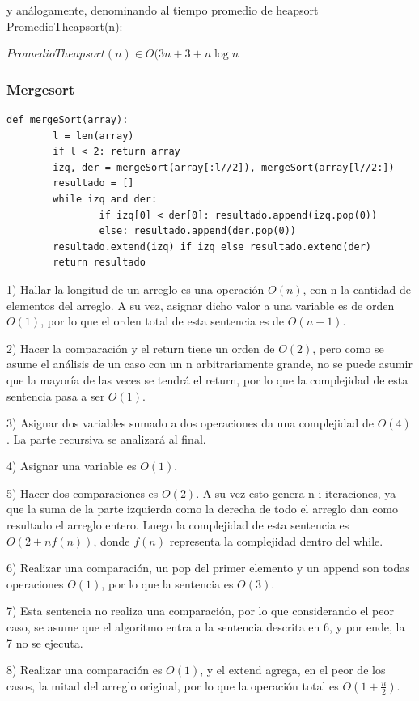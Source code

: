 \documentclass[article,a4paper]{article}
\begin{document}
y análogamente, denominando al tiempo promedio de heapsort PromedioTheapsort(n):

$PromedioTheapsort(n) \in O(3n + 3 +n \log n$ 

\subsubsection{Mergesort}
\begin{verbatim}
def mergeSort(array):
        l = len(array)
        if l < 2: return array
        izq, der = mergeSort(array[:l//2]), mergeSort(array[l//2:])
        resultado = []
        while izq and der:
                if izq[0] < der[0]: resultado.append(izq.pop(0))
                else: resultado.append(der.pop(0))
        resultado.extend(izq) if izq else resultado.extend(der)
        return resultado
\end{verbatim}

1)  Hallar la longitud de un arreglo es una operación $O(n)$, con n la cantidad de elementos del arreglo. A su vez, asignar dicho valor a una variable es de orden $O(1)$, por lo que el orden total de esta sentencia es de $O(n + 1)$.

2) Hacer la comparación y el return tiene un orden de $O(2)$, pero como se asume el análisis de un caso con un n arbitrariamente grande, no se puede asumir que la mayoría de las veces se tendrá el return, por lo que la complejidad de esta sentencia pasa a ser $O(1)$.

3) Asignar dos variables sumado a dos operaciones da una complejidad de $O(4)$. La parte recursiva se analizará al final.

4) Asignar una variable es $O(1)$.

5) Hacer dos comparaciones es $O(2)$. A su vez esto genera n i iteraciones, ya que la suma de la parte izquierda como la derecha de todo el arreglo dan como resultado el arreglo entero. Luego la complejidad de esta sentencia es $O(2 + nf(n))$, donde $f(n)$ representa la complejidad dentro del while.

6) Realizar una comparación, un pop del primer elemento y un append son todas operaciones $O(1)$, por lo que la sentencia es $O(3)$. 

7) Esta sentencia no realiza una comparación, por lo que considerando el peor caso, se asume que el algoritmo entra a la sentencia descrita en 6, y por ende, la 7 no se ejecuta.

8) Realizar una comparación es $O(1)$, y el extend agrega, en el peor de los casos, la mitad del arreglo original, por lo que la operación total es $O(1 + \frac{n}{2})$.
\end{document}
